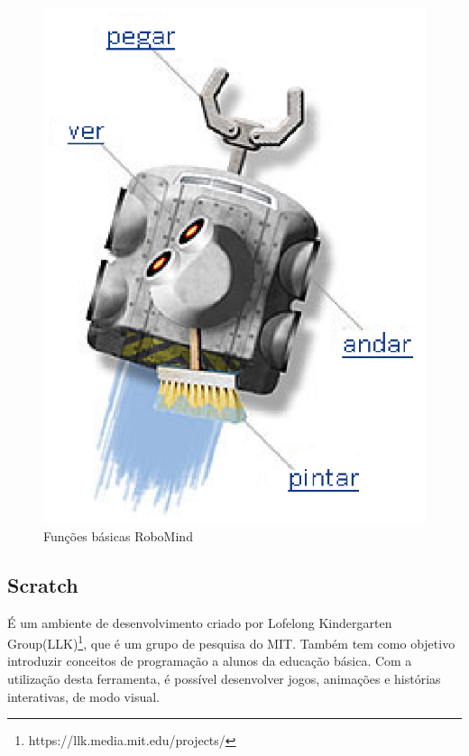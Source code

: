 		\begin{figure}[H]
			\centering
			\includegraphics[scale=0.8]{figuras/funcoesBasicasRoboMind.eps}
			\caption[Funções básicas RoboMind]{Funções básicas RoboMind}
			\label{img:funcoesBasicasRoboMind}
		\end{figure}
	

	\subsection{Scratch} %
	\label{sub:scratch}

		É um ambiente de desenvolvimento criado por Lofelong Kindergarten Group(LLK)\footnote{https://llk.media.mit.edu/projects/}, que é um grupo de pesquisa do MIT. Também tem como objetivo introduzir conceitos de programação a alunos da educação básica. Com a utilização desta ferramenta, é possível desenvolver jogos, animações e histórias interativas, de modo visual.


